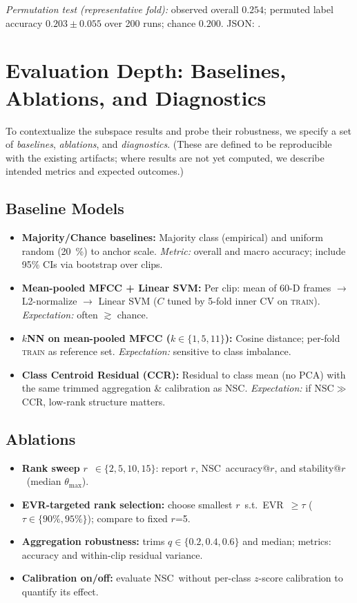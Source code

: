 \documentclass[11pt]{article}
\newcommand{\rankr}{\ensuremath{r}\xspace}
\newcommand{\EVR}{EVR\xspace}
\newcommand{\NSC}{NSC\xspace}
\begin{document}
\noindent\emph{Permutation test (representative fold):} observed overall $0.254$; permuted label accuracy $0.203 \pm 0.055$ over 200 runs; chance $0.200$. JSON: .

\section{Evaluation Depth: Baselines, Ablations, and Diagnostics}

To contextualize the subspace results and probe their robustness, we specify a set of \emph{baselines}, \emph{ablations}, and \emph{diagnostics}. (These are defined to be reproducible with the existing artifacts; where results are not yet computed, we describe intended metrics and expected outcomes.)

\subsection{Baseline Models}
\begin{itemize}
\item \textbf{Majority/Chance baselines:} Majority class (empirical) and uniform random (\SI{20}{\percent}) to anchor scale. \emph{Metric:} overall and macro accuracy; include 95\% CIs via bootstrap over clips.
\item \textbf{Mean-pooled MFCC + Linear SVM:} Per clip: mean of 60-D frames $\rightarrow$ L2-normalize $\rightarrow$ Linear SVM ($C$ tuned by 5-fold inner CV on \textsc{train}). \emph{Expectation:} often $\gtrsim$ chance.
\item \textbf{$k$NN on mean-pooled MFCC ($k\in\{1,5,11\}$):} Cosine distance; per-fold \textsc{train} as reference set. \emph{Expectation:} sensitive to class imbalance.
\item \textbf{Class Centroid Residual (CCR):} Residual to class mean (no PCA) with the same trimmed aggregation \& calibration as \NSC. \emph{Expectation:} if \NSC $\gg$ CCR, low-rank structure matters.
\end{itemize}

\subsection{Ablations}
\begin{itemize}
\item \textbf{Rank sweep} \rankr~$\in\{2,5,10,15\}$: report \EVR@\rankr, \NSC\ accuracy@\rankr, and stability@\rankr\ (median $\theta_{\max}$).
\item \textbf{\EVR-targeted rank selection:} choose smallest \rankr\ s.t.\ \EVR~$\ge \tau$ ($\tau\in\{90\%,95\%\}$); compare to fixed \rankr=5.
\item \textbf{Aggregation robustness:} trims $q\in\{0.2,0.4,0.6\}$ and median; metrics: accuracy and within-clip residual variance.
\item \textbf{Calibration on/off:} evaluate \NSC\ without per-class $z$-score calibration to quantify its effect.
\end{itemize}
\end{document}
